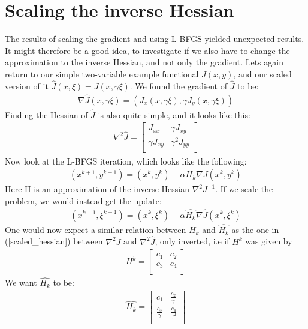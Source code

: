 \documentclass[11pt,a4paper]{article}
\begin{document}
\section{Scaling the inverse Hessian}
The results of scaling the gradient and using L-BFGS yielded unexpected results. It might therefore be a good idea, to investigate if we also have to change the approximation to the inverse Hessian, and not only the gradient. Lets again return to our simple two-variable example functional $J(x,y)$, and our scaled version of it $\hat{J}(x,\xi)=J(x,\gamma\xi)$. We found the gradient of $\hat{J}$ to be:
\begin{align*}
\nabla \hat{J}(x,\gamma\xi) = (J_x(x,\gamma\xi),\gamma J_y(x,\gamma\xi))
\end{align*}
Finding the Hessian of $\hat{J}$ is also quite simple, and it looks like this:
\begin{align}
  \nabla^2 \hat{J}=\left[ \begin{array}{cc}
   J_{xx} & \gamma J_{xy}\\
    \gamma J_{xy}& \gamma^2J_{yy}\\
   \end{array}  \right]  \label{scaled_hessian}  
\end{align}
Now look at the L-BFGS iteration, which looks like the following:
\begin{align*}
(x^{k+1},y^{k+1}) = (x^k,y^k) - \alpha H_k \nabla J(x^k,y^k)
\end{align*}
Here H is an approximation of the inverse Hessian $ \nabla^2 J^{-1}$. If we scale the problem, we would instead get the update:
\begin{align*}
(x^{k+1},\xi^{k+1}) = (x^k,\xi^k) - \alpha \hat{H_k} \nabla \hat{J}(x^k,\xi^k)
\end{align*}
One would now expect a similar relation between $H_k$ and $\hat{H_k}$ as the one in (\ref{scaled_hessian}) between $\nabla^2 J$ and $\nabla^2 \hat{J}$, only inverted, i.e if $H^k$ was given by
\begin{align*}
	H^k=\left[ \begin{array}{cc}
   	c_1 & c_2\\
    	c_3& c_4\\
   \end{array}  \right]
\end{align*}
We want  $\hat{H_k}$ to be:
\begin{align}
	\hat{H_k}=\left[ \begin{array}{cc}
   	c_1 & \frac{c_2}{\gamma}\\
    	\frac{c_3}{\gamma}& \frac{c_4}{\gamma^2}\\
   \end{array}  \right] \label{Ihessian_property}
\end{align}
\end{document}
